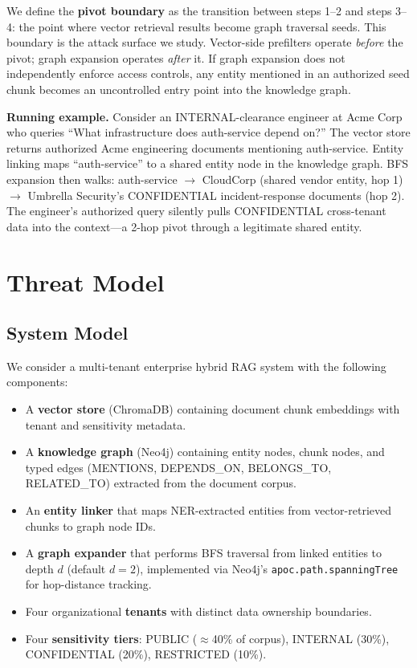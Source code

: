 \documentclass[letterpaper,twocolumn,10pt]{article}
\begin{document}
We define the \textbf{pivot boundary} as the transition between steps
1--2 and steps 3--4: the point where vector retrieval results become
graph traversal seeds. This boundary is the attack surface we study.
Vector-side prefilters operate \emph{before} the pivot; graph
expansion operates \emph{after} it. If graph expansion does not
independently enforce access controls, any entity mentioned in an
authorized seed chunk becomes an uncontrolled entry point into the
knowledge graph.

\textbf{Running example.} Consider an INTERNAL-clearance engineer at
Acme Corp who queries ``What infrastructure does auth-service depend
on?'' The vector store returns authorized Acme engineering documents
mentioning auth-service. Entity linking maps ``auth-service'' to a
shared entity node in the knowledge graph. BFS expansion then walks:
auth-service $\to$ CloudCorp (shared vendor entity, hop 1) $\to$
Umbrella Security's CONFIDENTIAL incident-response documents (hop 2).
The engineer's authorized query silently pulls CONFIDENTIAL
cross-tenant data into the context---a 2-hop pivot through a
legitimate shared entity.

\section{Threat Model}
\label{sec:threat_model}

\subsection{System Model}

We consider a multi-tenant enterprise hybrid RAG system with the
following components:

\begin{itemize}
\item A \textbf{vector store} (ChromaDB) containing document chunk
  embeddings with tenant and sensitivity metadata.
\item A \textbf{knowledge graph} (Neo4j) containing entity nodes,
  chunk nodes, and typed edges (MENTIONS, DEPENDS\_ON, BELONGS\_TO,
  RELATED\_TO) extracted from the document corpus.
\item An \textbf{entity linker} that maps NER-extracted entities from
  vector-retrieved chunks to graph node IDs.
\item A \textbf{graph expander} that performs BFS traversal from
  linked entities to depth $d$ (default $d=2$), implemented via
  Neo4j's \texttt{apoc.path.spanningTree} for hop-distance tracking.
\item Four organizational \textbf{tenants} with distinct data
  ownership boundaries.
\item Four \textbf{sensitivity tiers}: PUBLIC ($\approx$40\% of
  corpus), INTERNAL (30\%), CONFIDENTIAL (20\%), RESTRICTED (10\%).
\end{itemize}
\end{document}
